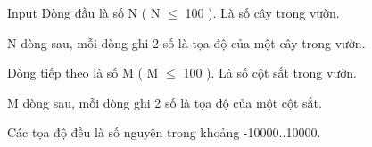 Input
Dòng đầu là số N ( N  $\le$  100 ). Là số cây trong vườn.   


   N dòng sau, mỗi dòng ghi 2 số là tọa độ của một cây trong vườn.   


   Dòng tiếp theo là số M ( M  $\le$  100 ). Là số cột sắt trong vườn.   


   M dòng sau, mỗi dòng ghi 2 số là tọa độ của một cột sắt.   


   Các tọa độ đều là số nguyên trong khoảng -10000..10000.